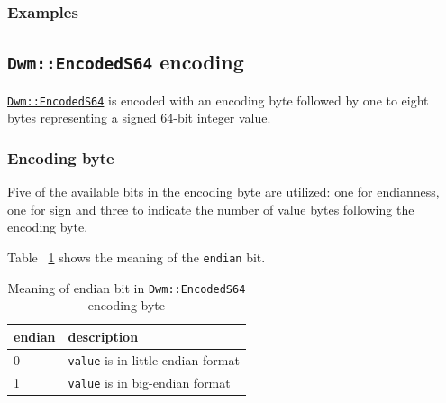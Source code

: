 \subsubsection{Examples}




\subsection{\texttt{Dwm::EncodedS64} encoding}\label{encoding:DwmEncodedS64}

\hyperref[class:EncodedS64]{\texttt{Dwm::EncodedS64}} is encoded with
an encoding byte followed by one to eight bytes representing a
signed 64-bit integer value.


\subsubsection{Encoding byte}

Five of the available bits in the encoding byte are utilized: one for
endianness, one for sign and three to indicate the number of value
bytes following the encoding byte.


  Table
~\ref{table:EncodedS64EndianBit} shows the meaning of the
\texttt{endian} bit.

\begin{table}[H]
\begin{center}
\begin{tabular}{ll}
  \textbf{endian} & \textbf{description} \\ \hline
  0 & \texttt{value} is in little-endian format \\ \hline
  1 & \texttt{value} is in big-endian format \\
\end{tabular}
\caption{Meaning of endian bit in \texttt{Dwm::EncodedS64} encoding byte}
\label{table:EncodedS64EndianBit}
\end{center}
\end{table}

